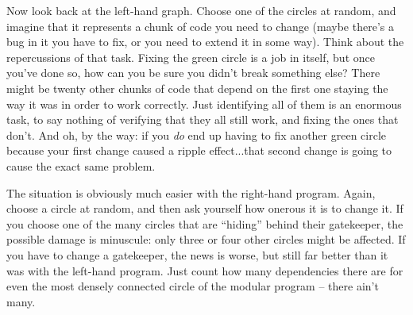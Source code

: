 Now look back at the left-hand graph. Choose one of the circles at random, and
imagine that it represents a chunk of code you need to change (maybe there's a
bug in it you have to fix, or you need to extend it in some way). Think about
the repercussions of that task. Fixing the green circle is a job in itself,
but once you've done so, how can you be sure you didn't break something else?
There might be twenty other chunks of code that depend on the first one
staying the way it was in order to work correctly. Just identifying all of
them is an enormous task, to say nothing of verifying that they all still
work, and fixing the ones that don't. And oh, by the way: if you \textit{do}
end up having to fix another green circle because your first change caused a
ripple effect...that second change is going to cause the exact same problem.

The situation is obviously much easier with the right-hand program. Again,
choose a circle at random, and then ask yourself how onerous it is to change
it. If you choose one of the many circles that are ``hiding'' behind their
gatekeeper, the possible damage is minuscule: only three or four other circles
might be affected. If you have to change a gatekeeper, the news is worse, but
still far better than it was with the left-hand program. Just count how many
dependencies there are for even the most densely connected circle of the
modular program -- there ain't many.

